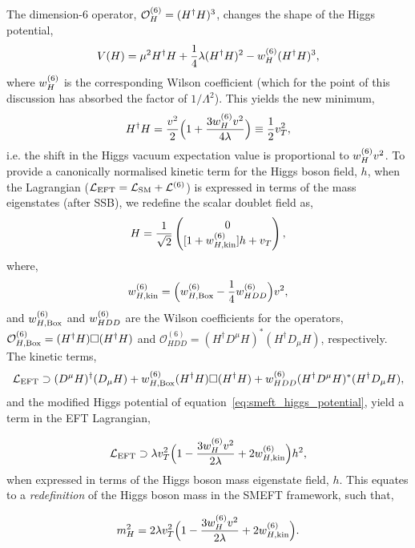 The dimension-6 operator, $\mathcal{O}^{\rm{(6)}}_H = (H^{\dagger}H)^3$, changes the shape of the Higgs potential,
\begin{equation}\label{eq:smeft_higgs_potential}
    V(H) = \mu^2H^{\dagger}H + \frac{1}{4}\lambda(H^{\dagger}H)^2 - w^{\rm{(6)}}_H (H^{\dagger}H)^3,
\end{equation}
\noindent
where $w^{\rm{(6)}}_H$ is the corresponding Wilson coefficient (which for the point of this discussion has absorbed the factor of $1/\Lambda^2$). This yields the new minimum, 
\begin{equation}
    H^{\dagger}H=\frac{v^2}{2}\Big(1+\frac{3w^{\rm{(6)}}_Hv^2}{4\lambda}\Big) \equiv \frac{1}{2}v_T^2,
\end{equation}
\noindent
i.e. the shift in the Higgs vacuum expectation value is proportional to $w^{\rm{(6)}}_Hv^2$. To provide a canonically normalised kinetic term for the Higgs boson field, $h$, when the Lagrangian ($\mathcal{L}_{\rm{EFT}}=\mathcal{L}_{\rm{SM}}+\mathcal{L}^{\rm{(6)}}$) is expressed in terms of the mass eigenstates (after SSB), we redefine the scalar doublet field as,
\begin{equation}
    H = \frac{1}{\sqrt{2}}\begin{pmatrix}
    0 \\
    [1+w^{\rm{(6)}}_{H,{\rm{kin}}}]h+v_T
    \end{pmatrix},
\end{equation}
\noindent
where,
\begin{equation}
    w^{\rm{(6)}}_{H,{\rm{kin}}} = \Big( w^{\rm{(6)}}_{H,\rm{Box}}-\frac{1}{4}w^{\rm{(6)}}_{HDD} \Big) v^2,
\end{equation}
\noindent
and $w^{\rm{(6)}}_{H,\rm{Box}}$ and $w^{\rm{(6)}}_{HDD}$ are the Wilson coefficients for the operators, ${\mathcal{O}^{(6)}_{H,{\rm{Box}}}=(H^{\dagger}H)\Box(H^{\dagger}H)}$ and ${\mathcal{O}^{(6)}_{HDD}=(H^{\dagger}D^{\mu}H)^*(H^{\dagger}D_{\mu}H)}$, respectively. The kinetic terms,
\begin{equation}
   \mathcal{L}_{\rm{EFT}} \supset (D^\mu H)^{\dagger}(D_\mu H)+w^{\rm{(6)}}_{H,\rm{Box}}(H^{\dagger}H)\Box(H^{\dagger}H)+w^{\rm{(6)}}_{HDD}(H^{\dagger}D^{\mu}H)^*(H^{\dagger}D_{\mu}H),
\end{equation}
\noindent
and the modified Higgs potential of equation~\ref{eq:smeft_higgs_potential}, yield a term in the EFT Lagrangian,

\begin{equation}
\mathcal{L}_{\rm{EFT}} \supset {\lambda}v_T^2\Big(1-\frac{3w^{\rm{(6)}}_Hv^2}{2\lambda}+2w^{\rm{(6)}}_{H,{\rm{kin}}}\Big)h^2,
\end{equation}
\noindent
when expressed in terms of the Higgs boson mass eigenstate field, $h$. This equates to a \textit{redefinition} of the Higgs boson mass in the SMEFT framework, such that,

\begin{equation}
    m_H^2 = 2{\lambda}v_T^2\Big(1-\frac{3w^{\rm{(6)}}_Hv^2}{2\lambda}+2w^{\rm{(6)}}_{H,{\rm{kin}}}\Big).
\end{equation}



